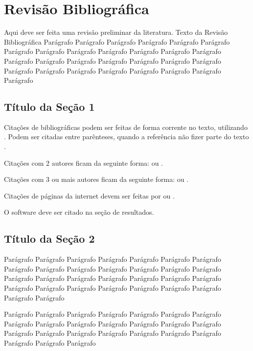 

\chapter{Revisão Bibliográfica}\label{cap_rev_bibliografica}

Aqui deve ser feita uma revisão preliminar da literatura. Texto da Revisão Bibliográfica Parágrafo Parágrafo Parágrafo Parágrafo Parágrafo Parágrafo Parágrafo Parágrafo Parágrafo Parágrafo Parágrafo Parágrafo Parágrafo Parágrafo Parágrafo Parágrafo Parágrafo Parágrafo Parágrafo Parágrafo Parágrafo Parágrafo Parágrafo Parágrafo Parágrafo Parágrafo Parágrafo Parágrafo 

\section{Título da Seção 1}


Citações de bibliográficas podem ser feitas de forma corrente no texto, utilizando . Podem ser citadas entre parênteses, quando a referência não fizer parte do texto \cite{morettin2017estatistica}.

Citações com 2 autores ficam da seguinte forma:
 ou \cite{colosimo2006analise}.

Citações com 3 ou mais autores ficam da seguinte forma:   ou \cite{carvalho2011analise}.

Citações de páginas da internet devem ser feitas por  ou \cite{FigCurvaAngulos}.

O software  deve ser citado na seção de resultados.

\section{Título da Seção 2}

Parágrafo Parágrafo Parágrafo Parágrafo Parágrafo Parágrafo Parágrafo Parágrafo Parágrafo Parágrafo Parágrafo Parágrafo Parágrafo Parágrafo Parágrafo Parágrafo Parágrafo Parágrafo Parágrafo Parágrafo Parágrafo Parágrafo Parágrafo Parágrafo Parágrafo Parágrafo Parágrafo Parágrafo Parágrafo Parágrafo 

Parágrafo Parágrafo Parágrafo Parágrafo Parágrafo Parágrafo Parágrafo Parágrafo Parágrafo Parágrafo Parágrafo Parágrafo Parágrafo Parágrafo Parágrafo Parágrafo Parágrafo Parágrafo Parágrafo Parágrafo Parágrafo Parágrafo Parágrafo Parágrafo 

